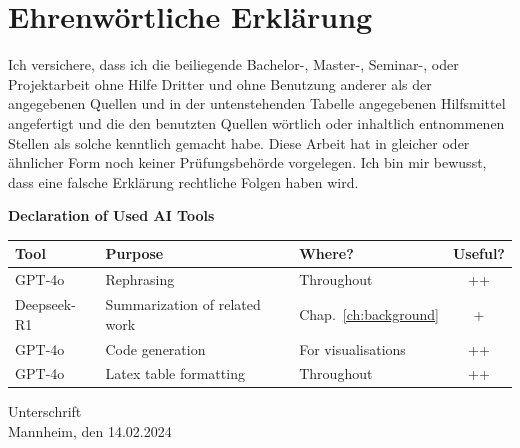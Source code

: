 \documentclass[a4paper,oneside,bibliography=totoc]{scrbook}
\begin{document}
\backmatter
\chapter{Ehrenwörtliche Erklärung}

Ich versichere, dass ich die beiliegende Bachelor-, Master-, Seminar-, oder
Projektarbeit ohne Hilfe Dritter und ohne Benutzung anderer als der angegebenen
Quellen und in der untenstehenden Tabelle angegebenen Hilfsmittel angefertigt
und die den benutzten Quellen wörtlich oder inhaltlich entnommenen Stellen als
solche kenntlich gemacht habe. Diese Arbeit hat in gleicher oder ähnlicher Form
noch keiner Prüfungsbehörde vorgelegen. Ich bin mir bewusst, dass eine falsche
Erklärung rechtliche Folgen haben wird.

\begin{center}
  \textbf{Declaration of Used AI Tools} \\[.3em]
  \begin{tabularx}{\textwidth}{lXlc}
    \toprule
    Tool & Purpose & Where? & Useful? \\
    \midrule
    GPT-4o & Rephrasing & Throughout & ++ \\
    Deepseek-R1 & Summarization of related work & Chap.~\ref{ch:background} & + \\
    GPT-4o & Code generation & For visualisations & ++ \\
    GPT-4o & Latex table formatting & Throughout & ++ \\
    \bottomrule
  \end{tabularx}
\end{center}

\vspace{2cm}
\noindent Unterschrift\\
\noindent Mannheim, den 14.02.2024 \hfill
\end{document}
